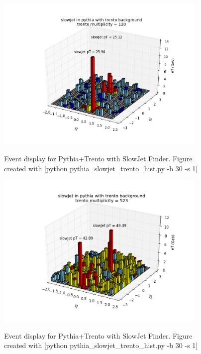 \documentclass[11pt]{article}
\begin{document}
\begin{figure}[h]
\begin{center}
\includegraphics[width=0.9\textwidth]{pythia_slowjet_trento_hist1.png}
\label{fig_label}
\caption{Event display for Pythia+Trento with SlowJet Finder.  Figure created with [python pythia\_slowjet\_trento\_hist.py -b 30 -s 1]}
\end{center}
\end{figure}

\begin{figure}[h]
\begin{center}
\includegraphics[width=0.9\textwidth]{pythia_slowjet_trento_hist2.png}
\label{fig_label}
\caption{Event display for Pythia+Trento with SlowJet Finder.  Figure created with [python pythia\_slowjet\_trento\_hist.py -b 30 -s 1]}
\end{center}
\end{figure}
\end{document}
